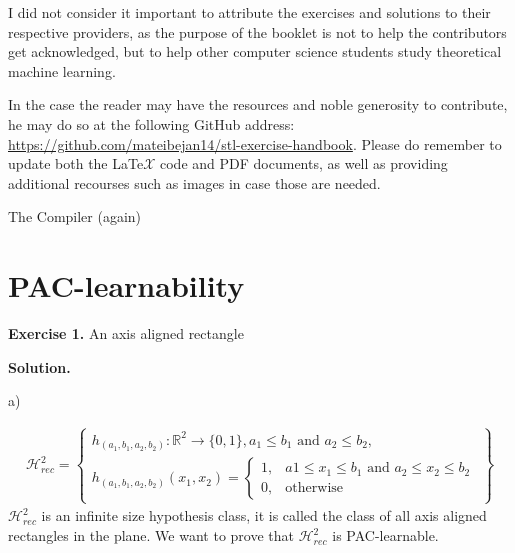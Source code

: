 \documentclass{article}
\newcommand{\<}{\langle}
\renewcommand{\>}{\rangle}
\theoremstyle{definition}
\def\gH{{\mathcal{H}}}
\def\sR{{\mathbb{R}}}
\newcommand{\hrs}{\gH_{rec}^2}
\newcommand{\sRs}{\sR^2}
\newcommand{\hrs}{\gH_{rec}^2}
\newcommand{\sRs}{\sR^2}
\begin{document}
I did not consider it important to attribute the exercises and solutions to their respective providers, as the purpose of the booklet is not to help the contributors get acknowledged, but to help other computer science students study theoretical machine learning.

In the case the reader may have the resources and noble generosity to contribute, he may do so at the following GitHub address: \url{https://github.com/mateibejan14/stl-exercise-handbook}. Please do remember to update both the LaTe$\mathcal{X}$ code and PDF documents, as well as providing additional recourses such as images in case those are needed.

\hspace{8cm} The Compiler (again)

\newpage

\tableofcontents

\newpage

\section{PAC-learnability}

\textbf{Exercise 1.} An axis aligned rectangle 

\textbf{Solution.}


a)

\begin{align*}
\hrs = \left\{
  \begin{array}{ll}
   h_{(a_1, b_1, a_2, b_2)} \colon \sRs \rightarrow \{0, 1\},
     a_1 \leq b_1 \text{ and } a_2 \leq b_2, \\
   h_{(a_1, b_1, a_2, b_2)}(x_1, x_2) = 
     \begin{cases}
       1, & a1 \leq x_1 \leq b_1 \text{ and } a_2 \leq x_2 \leq b_2 \\
       0, &\text{otherwise}
     \end{cases}
  \end{array}
        \right\}
\end{align*}
$\hrs$ is an infinite size hypothesis class, it is called the class of all axis aligned
rectangles in the plane. We want to prove that $\hrs$ is PAC-learnable.
\end{document}
